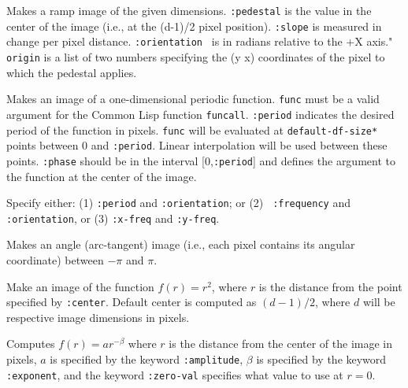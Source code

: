 \begin{description}
\item{}
Makes a ramp image of the given dimensions.  {\tt :pedestal} is the
value in the center of the image (i.e., at the (d-1)/2 pixel
position).  {\tt :slope} is measured in change per pixel distance.
{\tt :orientation } is in radians relative to the +X axis."  {\tt
origin} is a list of two numbers specifying the (y x) coordinates of
the pixel to which the pedestal applies.

\item{}
Makes an image of a one-dimensional periodic function.  {\tt func}
must be a valid argument for the Common Lisp function {\tt funcall}.
{\tt :period} indicates the desired period of the function in pixels.
{\tt func} will be evaluated at {\tt *default-df-size*} points between
0 and {\tt :period}. Linear interpolation will be used between these
points.  {\tt :phase} should be in the interval [0,{\tt :period}] and
defines the argument to the function at the center of the image.

\item{}

\item{}

\item{}
Specify either: (1) {\tt :period} and {\tt :orientation}; or (2) {\tt
:frequency} and {\tt :orientation}, or (3) {\tt :x-freq} and {\tt :y-freq}.

\item{}
Makes an angle (arc-tangent) image (i.e., each pixel contains its
angular coordinate) between $-\pi$ and $\pi$.

\item{}
Make an image of the function $f(r) = r^2$, where $r$ is the distance
from the point specified by {\tt :center}.  Default center is computed
as $(d-1)/2$, where $d$ will be respective image dimensions in pixels.

\item{}
Computes $f(r) = a r^{-\beta}$ where $r$ is the distance from the center of
the image in pixels, $a$ is specified by the keyword {\tt :amplitude},
$\beta$ is specified by the keyword {\tt :exponent}, and the keyword
{\tt :zero-val} specifies what value to use at $r=0$.


\end{description}
